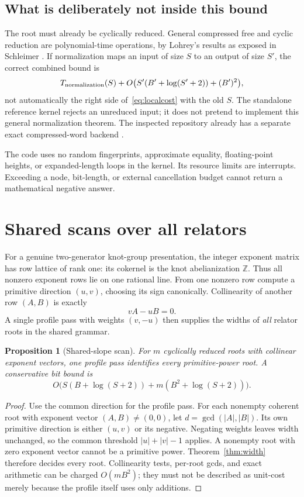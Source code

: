 \documentclass[11pt,letterpaper]{article}
\newtheorem{proposition}[theorem]{Proposition}
\theoremstyle{definition}
\newcommand{\Z}{\mathbb Z}
\begin{document}
\subsection{What is deliberately not inside this bound}
The root must already be cyclically reduced. General compressed free and
cyclic reduction are polynomial-time operations, by Lohrey's results as
exposed in Schleimer \cite[Theorem~3.3 and Corollary~3.6]{Schleimer}.
If normalization maps an input of size $S$ to an output of size $S'$, the
correct combined bound is
\[
 T_{\rm normalization}(S)+O\bigl(S'(B'+\log(S'+2))+(B')^2\bigr),
\]
not automatically the right side of~\eqref{eq:localcost} with the old $S$.
The standalone reference kernel rejects an unreduced input; it does not
pretend to implement this general normalization theorem. The inspected
repository already has a separate exact compressed-word backend
\cite{RepoWords}.

The code uses no random fingerprints, approximate equality, floating-point
heights, or expanded-length loops in the kernel. Its resource limits are
interrupts. Exceeding a node, bit-length, or external cancellation budget
cannot return a mathematical negative answer.

\section{Shared scans over all relators}
\label{sec:shared}
For a genuine two-generator knot-group presentation, the integer exponent
matrix has row lattice of rank one: its cokernel is the knot abelianization
$\Z$. Thus all nonzero exponent rows lie on one rational line. From one
nonzero row compute a primitive direction $(u,v)$, choosing its sign
canonically. Collinearity of another row $(A,B)$ is exactly
\[
 vA-uB=0.
\]
A single profile pass with weights $(v,-u)$ then supplies the widths of
\emph{all} relator roots in the shared grammar.

\begin{proposition}[Shared-slope scan]
\label{prop:shared}
For $m$ cyclically reduced roots with collinear exponent vectors, one profile
pass identifies every primitive-power root. A conservative bit bound is
\begin{equation}
 O\bigl(S(B+\log(S+2))+m(B^2+\log(S+2))\bigr).
 \label{eq:sharedcost}
\end{equation}
\end{proposition}
\begin{proof}
Use the common direction for the profile pass. For each nonempty coherent
root with exponent vector $(A,B)\ne(0,0)$, let
$d=\gcd(|A|,|B|)$. Its own primitive direction is either $(u,v)$ or its
negative. Negating weights leaves width unchanged, so the common threshold
$|u|+|v|-1$ applies. A nonempty root with zero exponent vector cannot be a
primitive power. Theorem~\ref{thm:width} therefore decides every root.
Collinearity tests, per-root gcds, and exact arithmetic can be charged
$O(mB^2)$; they must not be described as unit-cost merely because the
profile itself uses only additions.
\end{proof}
\end{document}
